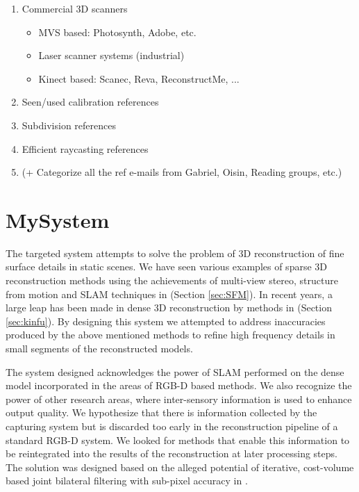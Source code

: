 \documentclass{ucl_thesis}
\newcommand{\secref}[1]{(Section \ref{#1})}
\begin{document}
\begin{enumerate}
		\item Commercial 3D scanners
		\begin{itemize}
			\item MVS based: Photosynth, Adobe, etc.
			\item Laser scanner systems (industrial)
			\item Kinect based: Scanec, Reva, ReconstructMe, ...
		\end{itemize}
		
		\item Seen/used calibration references
		\item Subdivision references
		\item Efficient raycasting references
		\item (+ Categorize all the ref e-mails from Gabriel, Oisin, Reading groups, etc.)
	
	\end{enumerate}

\chapter{MySystem} 
\label{chp:my_system}

\par The targeted system attempts to solve the problem of 3D reconstruction of fine surface details in static scenes. We have seen various examples of sparse 3D reconstruction methods using the achievements of multi-view stereo, structure from motion and SLAM techniques in \secref{sec:SFM}. In recent years, a large leap has been made in dense 3D reconstruction by methods in \secref{sec:kinfu}. By designing this system we attempted to address inaccuracies produced by the above mentioned methods to refine high frequency details in small segments of the reconstructed models. \\

\par The system designed acknowledges the power of SLAM performed on the dense model incorporated in the areas of RGB-D based methods. We also recognize the power of other research areas, where inter-sensory information is used to enhance output quality. We hypothesize that there is information collected by the capturing system but is discarded too early in the reconstruction pipeline of a standard RGB-D system. We looked for methods that enable this information to be reintegrated into the results of the reconstruction at later processing steps. The solution was designed based on the alleged potential of iterative, cost-volume based joint bilateral filtering with sub-pixel accuracy in \citep{cvpr-07-qingxiong-yang}. \\
\end{document}
